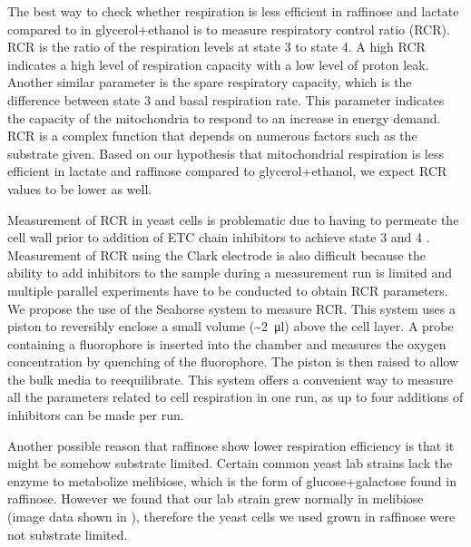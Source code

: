 The best way to check whether respiration is less efficient in raffinose and lactate compared to in glycerol+ethanol is to measure respiratory control ratio (RCR). RCR is the ratio of the respiration levels at state 3 to state 4. A high RCR indicates a high level of respiration capacity with a low level of proton leak. Another similar parameter is the spare respiratory capacity, which is the difference between state 3 and basal respiration rate. This parameter indicates the capacity of the mitochondria to respond to an increase in energy demand. RCR is a complex function that depends on numerous factors such as the substrate given. Based on our hypothesis that mitochondrial respiration is less efficient in lactate and raffinose compared to glycerol+ethanol, we expect RCR values to be lower as well.

Measurement of RCR in yeast cells is problematic due to having to permeate the cell wall prior to addition of ETC chain inhibitors to achieve state 3 and 4 \cite{palmeira_fluorescence_2012}. Measurement of RCR using the Clark electrode is also difficult because the ability to add inhibitors to the sample during a measurement run is limited and multiple parallel experiments have to be conducted to obtain RCR parameters. We propose the use of the Seahorse system \cite{gerencser_quantitative_2009} to measure RCR. This system uses a piston to reversibly enclose a small volume (\textasciitilde \SI{2}{\ul}) above the cell layer. A probe containing a fluorophore is inserted into the chamber and measures the oxygen concentration by quenching of the fluorophore. The piston is then raised to allow the bulk media to reequilibrate. This system offers a convenient way to measure all the parameters related to cell respiration in one run, as up to four additions of inhibitors can be made per run.

Another possible reason that raffinose show lower respiration efficiency is that it might be somehow substrate limited. Certain common yeast lab strains lack the enzyme to metabolize melibiose, which is the form of glucose+galactose found in raffinose. However we found that our lab strain grew normally in melibiose (image data shown in ), therefore the yeast cells we used grown in raffinose were not substrate limited.
